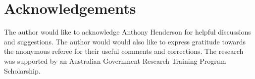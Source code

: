 \documentclass[12pt]{amsart}
\theoremstyle{plain}
\theoremstyle{definition}
\numberwithin{equation}{section}
\numberwithin{equation}{section}
\begin{document}
	\section*{Acknowledgements}
	The author would like to acknowledge Anthony Henderson for helpful discussions and suggestions. The author would would also like to express gratitude towards the anonymous referee for their useful comments and corrections. The research was supported by an Australian Government Research Training Program Scholarship.
	
	
	
	
	
	
\end{document}
